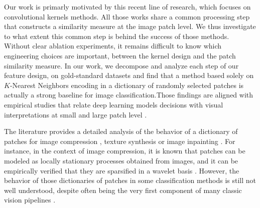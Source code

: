 \documentclass{article}
\newcommand{\mynotes}[1]{\textcolor{red}{#1}}
\begin{document}
Our work is primarly motivated by this recent line of research, which focuses on convolutional kernels methods.  All those works  share a common processing step that constructs a similarity measure at the image patch level. We thus investigate to what extent this common step is behind the success of those methods. 
Without clear ablation experiments, it remains difficult to know which  engineering choices are important, between the kernel design and the patch similarity measure. 
In our work, we decompose and analyze each step of our feature design, on gold-standard  datasets and find that a method based solely on $K$-Nearest Neighbors encoding in a dictionary of randomly selected patches is actually a strong baseline for image classification.Those findings are aligned with  empirical studies that relate deep learning models decisions with visual interpretations at small and large patch level
\citep{zeiler2014visualizing,brendel2019approximating}.

The literature provides a detailed analysis of the behavior of a dictionary of patches for image compression
\citep{wallace1992jpeg}, texture synthesis \citep{efros1999texture} or image inpainting \citep{criminisi2004region}. 
For instance, in the context of image compression, it is known that patches can be modeled as locally stationary processes obtained from images, and it can be empirically verified that they are sparsified in a wavelet basis \citep{mallat1999wavelet}. However, the behavior of those dictionaries of patches in some classification methods is still not well understood, despite often being the very first component of many classic vision pipelines \citep{perronnin2010improving,lowe2004distinctive,brendel2019approximating,oyallon2018scattering}.

\end{document}
